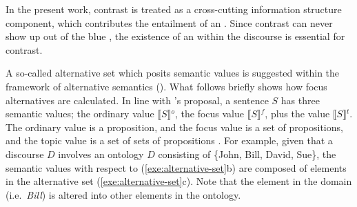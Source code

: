In the present work, contrast is treated as a cross-cutting
information structure component, which contributes the entailment of
an  \citep{molnar:02,krifka:08}.  Since contrast
can never show up out of the blue \citep[p.\ 9]{erteschik:07}, the
existence of an  within the discourse is essential for
contrast. 


A so-called alternative set which posits  semantic values is
suggested within the framework of alternative semantics
(\citealt{rooth:85,rooth:92}).  What follows briefly shows how focus
alternatives are calculated. In line with
\citeauthor{rooth:92}'s proposal, a sentence \ensuremath{S} has three
semantic values; the ordinary value \ensuremath{\llbracket S
  \rrbracket}$^{o}$, the focus value \ensuremath{\llbracket S
  \rrbracket}$^{f}$, plus the  value \ensuremath{\llbracket S
  \rrbracket}$^{t}$.  The ordinary value is a proposition, and the
focus value is a set of propositions, and the topic value is a set of
sets of propositions \citep[p.\ 184]{nakanishi:07}.  For example,
given that a discourse \ensuremath{D} involves an ontology
\ensuremath{D} consisting of \{John, Bill, David, Sue\}, the semantic
values with respect to (\ref{exe:alternative-set}b) are composed of
elements in the alternative set (\ref{exe:alternative-set}c). Note
that the element in the  domain (i.e.\ \textit{Bill}) is altered
into other elements in the ontology.





